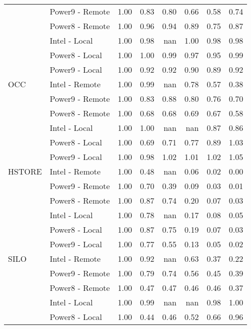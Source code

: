 \begin{tabular}{llrrrrrr}
       & Power9 - Remote &   1.00 &   0.83 &   0.80 &   0.66 &   0.58 &   0.74 \\
       & Power8 - Remote &   1.00 &   0.96 &   0.94 &   0.89 &   0.75 &   0.87 \\
       & Intel - Local &   1.00 &   0.98 &    nan &   1.00 &   0.98 &   0.98 \\
       & Power8 - Local &   1.00 &   1.00 &   0.99 &   0.97 &   0.95 &   0.99 \\
       & Power9 - Local &   1.00 &   0.92 &   0.92 &   0.90 &   0.89 &   0.92 \\
OCC & Intel - Remote &   1.00 &   0.99 &    nan &   0.78 &   0.57 &   0.38 \\
       & Power9 - Remote &   1.00 &   0.83 &   0.88 &   0.80 &   0.76 &   0.70 \\
       & Power8 - Remote &   1.00 &   0.68 &   0.68 &   0.69 &   0.67 &   0.58 \\
       & Intel - Local &   1.00 &   1.00 &    nan &    nan &   0.87 &   0.86 \\
       & Power8 - Local &   1.00 &   0.69 &   0.71 &   0.77 &   0.89 &   1.03 \\
       & Power9 - Local &   1.00 &   0.98 &   1.02 &   1.01 &   1.02 &   1.05 \\
HSTORE & Intel - Remote &   1.00 &   0.48 &    nan &   0.06 &   0.02 &   0.00 \\
       & Power9 - Remote &   1.00 &   0.70 &   0.39 &   0.09 &   0.03 &   0.01 \\
       & Power8 - Remote &   1.00 &   0.87 &   0.74 &   0.20 &   0.07 &   0.03 \\
       & Intel - Local &   1.00 &   0.78 &    nan &   0.17 &   0.08 &   0.05 \\
       & Power8 - Local &   1.00 &   0.87 &   0.75 &   0.19 &   0.07 &   0.03 \\
       & Power9 - Local &   1.00 &   0.77 &   0.55 &   0.13 &   0.05 &   0.02 \\
SILO & Intel - Remote &   1.00 &   0.92 &    nan &   0.63 &   0.37 &   0.22 \\
       & Power9 - Remote &   1.00 &   0.79 &   0.74 &   0.56 &   0.45 &   0.39 \\
       & Power8 - Remote &   1.00 &   0.47 &   0.47 &   0.46 &   0.46 &   0.37 \\
       & Intel - Local &   1.00 &   0.99 &    nan &    nan &   0.98 &   1.00 \\
       & Power8 - Local &   1.00 &   0.44 &   0.46 &   0.52 &   0.66 &   0.96 \\

\end{tabular}
